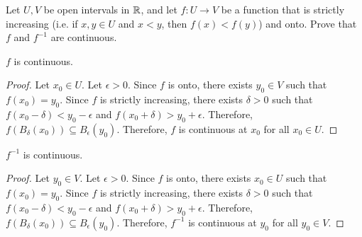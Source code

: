 \begin{problem}
  Let $U, V$ be open intervals in $\mathbb{R}$,
  and let $f : U \to V$ be a function that is strictly increasing
  (i.e. if $x, y \in U$ and $x < y$, then $f(x) < f(y)$) and onto.
  Prove that $f$ and $f^{-1}$ are continuous.

  \begin{answer}
    \begin{claim}
      $f$ is continuous.
      \begin{proof}
        Let $x_0 \in U$.
        Let $\epsilon > 0$.
        Since $f$ is onto, there exists $y_0 \in V$ such that $f(x_0) = y_0$.
        Since $f$ is strictly increasing, there exists $\delta > 0$ such that
        $f(x_0 - \delta) < y_0 - \epsilon$ and $f(x_0 + \delta) > y_0 + \epsilon$.
        Therefore, $f(B_\delta(x_0)) \subseteq B_\epsilon(y_0)$.
        Therefore, $f$ is continuous at $x_0$ for all $x_0 \in U$.
      \end{proof}
    \end{claim}

    \begin{claim}
      $f^{-1}$ is continuous.
      \begin{proof}
        Let $y_0 \in V$.
        Let $\epsilon > 0$.
        Since $f$ is onto, there exists $x_0 \in U$ such that $f(x_0) = y_0$.
        Since $f$ is strictly increasing, there exists $\delta > 0$ such that
        $f(x_0 - \delta) < y_0 - \epsilon$ and $f(x_0 + \delta) > y_0 + \epsilon$.
        Therefore, $f(B_\delta(x_0)) \subseteq B_\epsilon(y_0)$.
        Therefore, $f^{-1}$ is continuous at $y_0$ for all $y_0 \in V$.
      \end{proof}
    \end{claim}
  \end{answer}
\end{problem}
